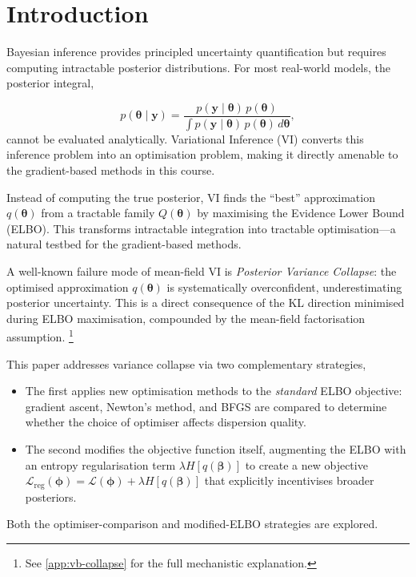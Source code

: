 \documentclass[11pt]{article}
\begin{document}
\section*{Introduction}

Bayesian inference provides principled uncertainty quantification but requires computing intractable posterior distributions. For most real-world models, the posterior integral,

\begin{equation*}
    p(\bm{\theta} \mid \bm{y}) = \frac{p(\bm{y} \mid \bm{\theta})\,p(\bm{\theta})}{\displaystyle\int p(\bm{y} \mid \bm{\theta})\,p(\bm{\theta})\, d\bm{\theta}},
\end{equation*}
\noindent 
cannot be evaluated analytically. 
Variational Inference (VI) converts this inference problem into an optimisation problem, making it directly amenable to the gradient-based methods in this course. \vspace{2em}

Instead of computing the true posterior, VI finds the ``best'' approximation $q(\bm{\theta})$ from a tractable family $Q(\bm{\theta})$
by maximising the Evidence Lower Bound (ELBO). 
This transforms intractable integration into tractable optimisation---a natural testbed for the gradient-based methods. \vspace{2em} 

A well-known failure mode of mean-field VI is \emph{Posterior Variance Collapse}: 
the optimised approximation $q(\bm{\theta})$ is systematically overconfident, 
underestimating posterior uncertainty. This is a direct consequence of the KL direction minimised during ELBO maximisation, 
compounded by the mean-field factorisation assumption. \footnote{See \ref{app:vb-collapse} for the full mechanistic explanation.}  \vspace{2em} 

This paper addresses variance collapse via two complementary strategies, 
\begin{itemize}
\item The first applies new optimisation methods to the \emph{standard} ELBO objective: gradient ascent, Newton's method, and BFGS are compared to determine whether the choice of optimiser affects dispersion quality.
\item The second modifies the objective function itself, augmenting the ELBO with an entropy regularisation term $\lambda H[q(\bm{\beta})]$ to create a new objective $\mathcal{L}_{\mathrm{reg}}(\bm{\phi}) = \mathcal{L}(\bm{\phi}) + \lambda H[q(\bm{\beta})]$ that explicitly incentivises broader posteriors.
\end{itemize}
Both the optimiser-comparison and modified-ELBO strategies are explored.  \vspace{2em} 
\end{document}

